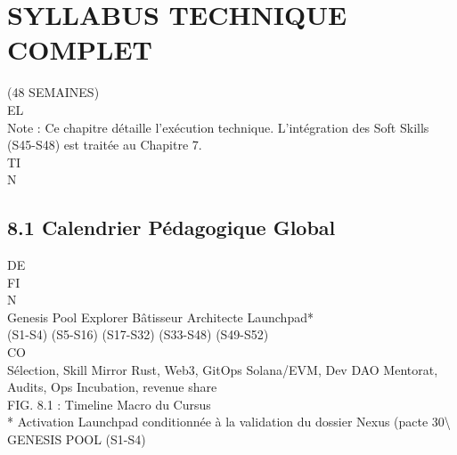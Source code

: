 \documentclass[12pt,landscape,a4paper]{article}
\begin{document}
\section{SYLLABUS TECHNIQUE COMPLET}
(48 SEMAINES)\\
\vspace{0.5em}
\vspace{0.5em}
\vspace{0.5em}
\vspace{0.5em}
EL\\
Note : Ce chapitre détaille l’exécution technique. L’intégration des Soft Skills (S45-S48) est traitée au Chapitre 7.\\
\vspace{0.5em}
\vspace{0.5em}
\vspace{0.5em}
\vspace{0.5em}
TI\\
N\\
\subsection{8.1 Calendrier Pédagogique Global}
\vspace{0.5em}
\vspace{0.5em}
\vspace{0.5em}
\vspace{0.5em}
DE\\
FI\\
N\\
Genesis Pool               Explorer                Bâtisseur            Architecte               Launchpad*\\
(S1-S4)                  (S5-S16)                (S17-S32)            (S33-S48)                 (S49-S52)\\
CO\\
Sélection, Skill Mirror   Rust, Web3, GitOps     Solana/EVM, Dev DAO   Mentorat, Audits, Ops   Incubation, revenue share\\
\vspace{0.5em}
\vspace{0.5em}
\vspace{0.5em}
FIG. 8.1 : Timeline Macro du Cursus\\
\vspace{0.5em}
* Activation Launchpad conditionnée à la validation du dossier Nexus (pacte 30\textbackslash{}%
\vspace{0.5em}
GENESIS POOL (S1-S4)\\
\vspace{0.5em}
\end{document}
